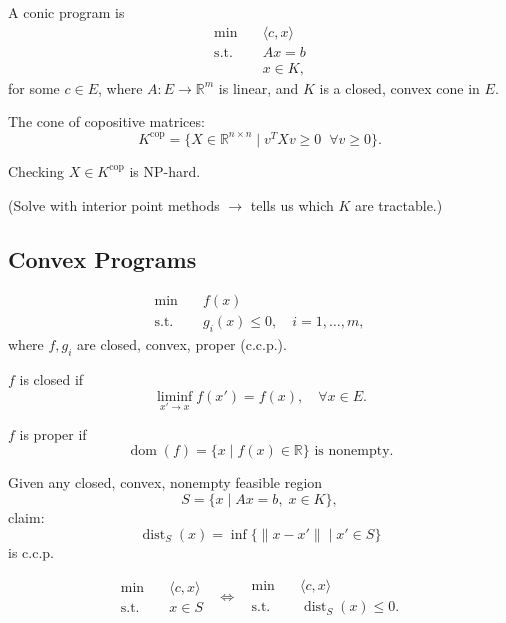 \documentclass[12pt,oneside]{book}
\numberwithin{equation}{section}
\theoremstyle{definition}
\theoremstyle{plain}
\theoremstyle{remark}
\begin{document}
A conic program is
\[
\begin{aligned}
\min \quad & \langle c, x \rangle \\
\text{s.t.} \quad & Ax = b \\
& x \in K,
\end{aligned}
\]
for some $c \in E$, where $A : E \to \mathbb{R}^m$ is linear, and $K$ is a closed, convex cone in $E$.

\medskip

The cone of copositive matrices:
\[
K^{\mathrm{cop}} = \{ X \in \mathbb{R}^{n \times n} \mid v^T X v \ge 0 \;\; \forall v \ge 0 \}.
\]

Checking $X \in K^{\mathrm{cop}}$ is NP-hard.

\medskip

(Solve with interior point methods $\rightarrow$ tells us which $K$ are tractable.)

\subsection{Convex Programs}

\[
\begin{aligned}
\min \quad & f(x) \\
\text{s.t.} \quad & g_i(x) \le 0, \quad i = 1,\dots,m,
\end{aligned}
\]
where $f,g_i$ are closed, convex, proper (c.c.p.).

\medskip

$f$ is closed if
\[
\liminf_{x' \to x} f(x') = f(x), \quad \forall x \in E.
\]

$f$ is proper if
\[
\operatorname{dom}(f) = \{x \mid f(x) \in \mathbb{R} \} \text{ is nonempty.}
\]

\medskip

Given any closed, convex, nonempty feasible region
\[
S = \{ x \mid Ax = b,\; x \in K \},
\]
claim:
\[
\operatorname{dist}_S(x) = \inf \{ \|x - x'\| \mid x' \in S \}
\]
is c.c.p.

\medskip

\[
\begin{aligned}
\min \quad & \langle c, x \rangle \\
\text{s.t.} \quad & x \in S
\end{aligned}
\;\;\Longleftrightarrow\;\;
\begin{aligned}
\min \quad & \langle c, x \rangle \\
\text{s.t.} \quad & \operatorname{dist}_S(x) \le 0.
\end{aligned}
\]
\end{document}
